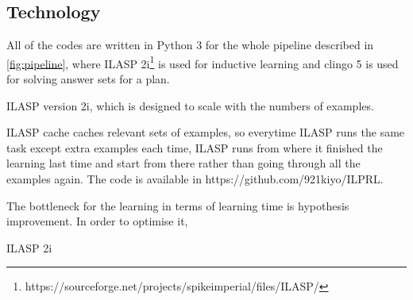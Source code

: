 \subsection{Technology}

All of the codes are written in Python 3 for the whole pipeline described in \ref{fig:pipeline}, where ILASP 2i\footnote{https://sourceforge.net/projects/spikeimperial/files/ILASP/} is used for inductive learning and clingo 5 is used for solving answer sets for a plan.

ILASP version 2i, which is designed to scale with the numbers of examples.

ILASP cache caches relevant sets of examples, so everytime ILASP runs the same task except extra examples each time, ILASP runs from where it finished the learning last time and start from there rather than going through all the examples again.
The code is available in https://github.com/921kiyo/ILPRL.

The bottleneck for the learning in terms of learning time is hypothesis improvement. In order to optimise it,

ILASP 2i
